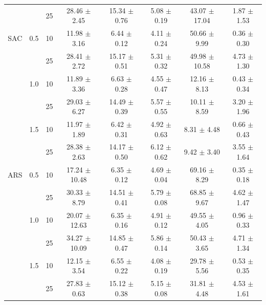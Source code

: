 \documentclass[manuscript,screen,review]{acmart}
\begin{document}
\begin{table}[th]
{\begin{tabular}{cccccccc}
    &     & 25 &  28.46 $\pm$    2.45 &   15.34 $\pm$   0.76 &           5.08 $\pm$   0.19 &    43.07 $\pm$   17.04 &                    1.87 $\pm$   1.53 \\
SAC & 0.5 & 10 &  11.98 $\pm$    3.16 &    6.44 $\pm$   0.12 &           4.11 $\pm$   0.24 &    50.66 $\pm$    9.99 &                    0.36 $\pm$   0.30 \\
    &     & 25 &  28.41 $\pm$    2.72 &   15.17 $\pm$   0.51 &           5.31 $\pm$   0.32 &    49.98 $\pm$   10.58 &                    4.73 $\pm$   1.30 \\
    & 1.0 & 10 &  11.89 $\pm$    3.36 &    6.63 $\pm$   0.28 &           4.55 $\pm$   0.47 &    12.16 $\pm$    8.13 &                    0.43 $\pm$   0.34 \\
    &     & 25 &  29.03 $\pm$    6.27 &   14.49 $\pm$   0.39 &           5.57 $\pm$   0.55 &    10.11 $\pm$    8.59 &                    3.20 $\pm$   1.96 \\
    & 1.5 & 10 &  11.97 $\pm$    1.89 &    6.42 $\pm$   0.31 &           4.92 $\pm$   0.63 &     8.31 $\pm$    4.48 &                    0.66 $\pm$   0.43 \\
    &     & 25 &  28.38 $\pm$    2.63 &   14.17 $\pm$   0.50 &           6.12 $\pm$   0.62 &     9.42 $\pm$    3.40 &                    3.55 $\pm$   1.64 \\
ARS & 0.5 & 10 &  17.24 $\pm$   10.48 &    6.35 $\pm$   0.12 &           4.69 $\pm$   0.04 &    69.16 $\pm$    8.29 &                    0.35 $\pm$   0.18 \\
    &     & 25 &  30.33 $\pm$    8.79 &   14.51 $\pm$   0.41 &           5.79 $\pm$   0.08 &    68.85 $\pm$    9.67 &                    4.62 $\pm$   1.47 \\
    & 1.0 & 10 &  20.07 $\pm$   12.63 &    6.35 $\pm$   0.16 &           4.91 $\pm$   0.12 &    49.55 $\pm$    4.05 &                    0.96 $\pm$   0.33 \\
    &     & 25 &  34.27 $\pm$   10.09 &   14.85 $\pm$   0.47 &           5.86 $\pm$   0.14 &    50.43 $\pm$    3.65 &                    4.71 $\pm$   1.34 \\
    & 1.5 & 10 &  12.15 $\pm$    3.54 &    6.55 $\pm$   0.22 &           4.08 $\pm$   0.19 &    29.78 $\pm$    5.56 &                    0.53 $\pm$   0.35 \\
    &     & 25 &  27.83 $\pm$    0.63 &   15.12 $\pm$   0.38 &           5.15 $\pm$   0.08 &    31.81 $\pm$    4.48 &                    4.53 $\pm$   1.61 \\


\end{tabular}}
\end{table}
\end{document}
